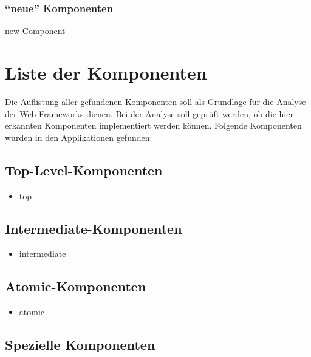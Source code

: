   \subsubsection{``neue'' Komponenten}
  
  \begin{description}
    \item[new Component]
  \end{description}
  
  \section{Liste der Komponenten}
  
  Die Auflistung aller gefundenen Komponenten soll als Grundlage für die Analyse
  der Web Frameworks dienen. Bei der Analyse soll geprüft werden, ob die hier
  erkannten Komponenten implementiert werden können. Folgende Komponenten
  wurden in den Applikationen gefunden:
  
  \subsection{Top-Level-Komponenten}
  
  \begin{itemize}
    \item top
  \end{itemize}
  
  \subsection{Intermediate-Komponenten}
  
  \begin{itemize}
    \item intermediate
  \end{itemize}
  
  \subsection{Atomic-Komponenten}
  
  \begin{itemize}
    \item atomic
  \end{itemize}
  
  \subsection{Spezielle Komponenten}
  

